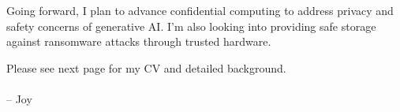 \vspace{3ex}
Going forward, I plan to advance confidential computing to address privacy and safety concerns of generative AI. I'm also looking into providing safe storage against ransomware attacks through trusted hardware. 

\vspace{3ex}

Please see next page for my CV and detailed background. \\
\paragraph*{}
\begin{flushright} -- Joy\end{flushright}
